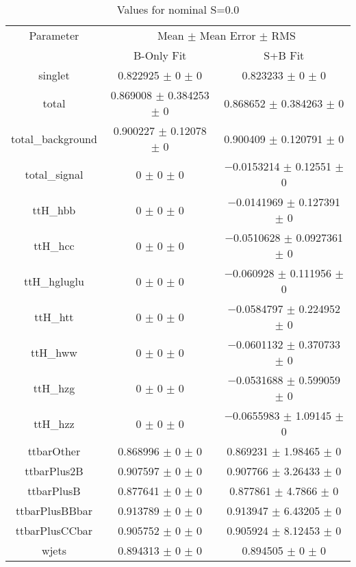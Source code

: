 \begin{table}
\centering
\caption{Values for nominal S=0.0}
\begin{tabular}{ccc}
\toprule
Parameter & \multicolumn{2}{c}{Mean $\pm$ Mean Error $\pm$ RMS}\\
 & B-Only Fit & S+B Fit\\
\midrule
singlet & \num{0.822925} $\pm$ \num{0} $\pm$ \num{0} & \num{0.823233} $\pm$ \num{0} $\pm$ \num{0}\\
total & \num{0.869008} $\pm$ \num{0.384253} $\pm$ \num{0} & \num{0.868652} $\pm$ \num{0.384263} $\pm$ \num{0}\\
total\_background & \num{0.900227} $\pm$ \num{0.12078} $\pm$ \num{0} & \num{0.900409} $\pm$ \num{0.120791} $\pm$ \num{0}\\
total\_signal & \num{0} $\pm$ \num{0} $\pm$ \num{0} & \num{-0.0153214} $\pm$ \num{0.12551} $\pm$ \num{0}\\
ttH\_hbb & \num{0} $\pm$ \num{0} $\pm$ \num{0} & \num{-0.0141969} $\pm$ \num{0.127391} $\pm$ \num{0}\\
ttH\_hcc & \num{0} $\pm$ \num{0} $\pm$ \num{0} & \num{-0.0510628} $\pm$ \num{0.0927361} $\pm$ \num{0}\\
ttH\_hgluglu & \num{0} $\pm$ \num{0} $\pm$ \num{0} & \num{-0.060928} $\pm$ \num{0.111956} $\pm$ \num{0}\\
ttH\_htt & \num{0} $\pm$ \num{0} $\pm$ \num{0} & \num{-0.0584797} $\pm$ \num{0.224952} $\pm$ \num{0}\\
ttH\_hww & \num{0} $\pm$ \num{0} $\pm$ \num{0} & \num{-0.0601132} $\pm$ \num{0.370733} $\pm$ \num{0}\\
ttH\_hzg & \num{0} $\pm$ \num{0} $\pm$ \num{0} & \num{-0.0531688} $\pm$ \num{0.599059} $\pm$ \num{0}\\
ttH\_hzz & \num{0} $\pm$ \num{0} $\pm$ \num{0} & \num{-0.0655983} $\pm$ \num{1.09145} $\pm$ \num{0}\\
ttbarOther & \num{0.868996} $\pm$ \num{0} $\pm$ \num{0} & \num{0.869231} $\pm$ \num{1.98465} $\pm$ \num{0}\\
ttbarPlus2B & \num{0.907597} $\pm$ \num{0} $\pm$ \num{0} & \num{0.907766} $\pm$ \num{3.26433} $\pm$ \num{0}\\
ttbarPlusB & \num{0.877641} $\pm$ \num{0} $\pm$ \num{0} & \num{0.877861} $\pm$ \num{4.7866} $\pm$ \num{0}\\
ttbarPlusBBbar & \num{0.913789} $\pm$ \num{0} $\pm$ \num{0} & \num{0.913947} $\pm$ \num{6.43205} $\pm$ \num{0}\\
ttbarPlusCCbar & \num{0.905752} $\pm$ \num{0} $\pm$ \num{0} & \num{0.905924} $\pm$ \num{8.12453} $\pm$ \num{0}\\
wjets & \num{0.894313} $\pm$ \num{0} $\pm$ \num{0} & \num{0.894505} $\pm$ \num{0} $\pm$ \num{0}\\
\bottomrule
\end{tabular}
\end{table}